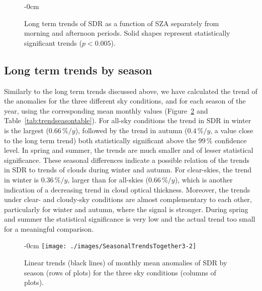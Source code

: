 \documentclass[applsci,article,submit,moreauthors,pdftex]{Definitions/mdpi}
\begin{document}
\begin{figure}[h!]
    \begin{adjustwidth}{-\extralength}{0cm}
        {\centering 
            \hfill
            \hfill
        }
        \caption{Long term trends of SDR as a function of SZA separately from morning and afternoon periods. Solid shapes  represent statistically significant trends ($p < 0.005$).}\label{fig:szatrends}
    \end{adjustwidth}
\end{figure}

\hypertarget{long-term-trends-by-season}{%
\subsection{Long term trends by
season}\label{long-term-trends-by-season}}

Similarly to the long term trends discussed above, we have calculated
the trend of the anomalies for the three different sky conditions, and
for each season of the year, using the corresponding mean monthly values
(Figure~\ref{fig:seasonalALL} and Table~\ref{tab:trendseasontable}). For
all-sky conditions the trend in SDR in winter is the largest
(\(0.66\,\%/y\)), followed by the trend in autumn (\(0.4\,\%/y\), a
value close to the long term trend) both statistically significant above
the \(99\,\%\) confidence level. In spring and summer, the trends are
much smaller and of lesser statistical significance. These seasonal
differences indicate a possible relation of the trends in SDR to trends
of clouds during winter and autumn. For clear-skies, the trend in winter
is \(0.36\,\%/y\), larger than for all-skies (\(0.66\,\%/y\)), which is
another indication of a decreasing trend in cloud optical thickness.
Moreover, the trends under clear- and cloudy-sky conditions are almost
complementary to each other, particularly for winter and autumn, where
the signal is stronger. During spring and summer the statistical
significance is very low and the actual trend too small for a meaningful
comparison.

\begin{figure}[h!]
    \begin{adjustwidth}{-\extralength}{0cm}
        {\centering 
            \texttt{[image: ./images/SeasonalTrendsTogether3-2]} 
        }
        \caption{Linear trends (black lines) of monthly mean anomalies of SDR by season (rows of plots) for the three sky conditions (columns of plots).}\label{fig:seasonalALL}
    \end{adjustwidth}
\end{figure}
\end{document}
